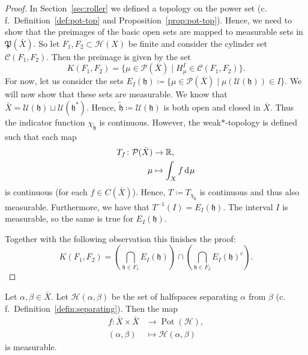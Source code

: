 \begin{proof}
  In Section~\ref{sec:roller} we defined a topology on the power set (c.\,f.\ Definition~\ref{def:pot-top} and Proposition~\ref{prop:pot-top}). Hence, we need to show that the preimages of the basic open sets are mapped to measurable sets in \(\mathfrak{P}(\bar X)\). So let \(F_1, F_2 \subset \mathcal{H}(X)\) be finite and consider the cylinder set \(\mathcal{C}(F_1, F_2)\). Then the preimage is given by the set
  \[
    K(F_1, F_2) = \{\mu \in \mathcal{P}(\bar X) \mid H^I_\mu \in \mathcal{C}(F_1, F_2)\}.
  \]
  For now, let us consider the sets \(E_I(\mathfrak{h}) \coloneqq \{\mu \in \mathcal{P}(\bar X) \mid \mu(\mathcal{U}(\mathfrak{h})) \in I\}\). We will now show that these sets are measurable. We know that \(\bar X = \mathcal{U}(\mathfrak{h}) \sqcup \mathcal{U}(\mathfrak{h}^\ast)\). Hence, \(\mathfrak{\tilde h} \coloneqq \mathcal{U}(\mathfrak{h})\) is both open and closed in \(\bar X\). Thus the indicator function \(\chi_{\mathfrak{\tilde h}}\) is continuous. However, the weak\(\ast\)-topology is defined such that each map
  \begin{align*}
    T_f\colon \mathcal{P}(\bar X) &\to \R,\\
    \mu &\mapsto \int_X f \d\mu
  \end{align*}
  is continuous (for each \(f \in C(\bar X)\)). Hence, \(T \coloneqq T_{\chi_{\mathfrak{\tilde h}}}\) is continuous and thus also measurable. Furthermore, we have that \(T^{-1}(I) = E_I(\mathfrak{h})\). The interval \(I\) is measurable, so the same is true for \(E_I(\mathfrak{h})\).

  Together with the following observation this finishes the proof:
  \[
    K(F_1, F_2) = \left (\bigcap_{\mathfrak{h} \in F_1} E_I(\mathfrak{h}) \right ) \cap \left ( \bigcap_{\mathfrak{h} \in F_2} E_I(\mathfrak{h})^{c}\right).
  \]
\end{proof}


\begin{lemma}
  \label{lem:measurable-interval}
  Let \(\alpha, \beta \in \bar X\). Let \(\mathcal{H}(\alpha, \beta)\) be the set of halfspaces separating \(\alpha\) from \(\beta\) (c.\,f.\ Definition~\ref{defin:separating}). Then the map
  \begin{align*}
    f\colon \bar X \times \bar X &\to \operatorname{Pot}(\mathcal{H}),\\
    (\alpha, \beta) &\mapsto \mathcal{H}(\alpha, \beta)
  \end{align*}
  is measurable.
\end{lemma}

